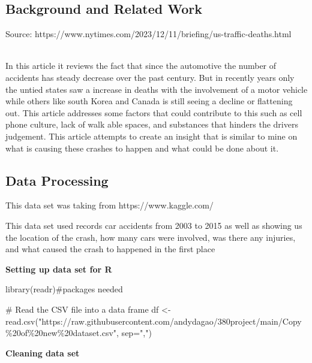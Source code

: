 \documentclass[
  letterpaper,
  DIV=11,
  numbers=noendperiod]{scrartcl}
\newenvironment{Shaded}{\begin{snugshade}}{\end{snugshade}}
\newcommand{\AttributeTok}[1]{\textcolor[rgb]{0.40,0.45,0.13}{#1}}
\newcommand{\CommentTok}[1]{\textcolor[rgb]{0.37,0.37,0.37}{#1}}
\newcommand{\FunctionTok}[1]{\textcolor[rgb]{0.28,0.35,0.67}{#1}}
\newcommand{\NormalTok}[1]{\textcolor[rgb]{0.00,0.23,0.31}{#1}}
\newcommand{\OtherTok}[1]{\textcolor[rgb]{0.00,0.23,0.31}{#1}}
\newcommand{\StringTok}[1]{\textcolor[rgb]{0.13,0.47,0.30}{#1}}
\begin{document}
\hypertarget{background-and-related-work}{%
\subsection{Background and Related
Work}\label{background-and-related-work}}

Source:
https://www.nytimes.com/2023/12/11/briefing/us-traffic-deaths.html\\
\strut \\
In this article it reviews the fact that since the automotive the number
of accidents has steady decrease over the past century. But in recently
years only the untied states saw a increase in deaths with the
involvement of a motor vehicle while others like south Korea and Canada
is still seeing a decline or flattening out. This article addresses some
factors that could contribute to this such as cell phone culture, lack
of walk able spaces, and substances that hinders the drivers judgement.
This article attempts to create an insight that is similar to mine on
what is causing these crashes to happen and what could be done about it.

\hypertarget{data-processing}{%
\subsection{Data Processing}\label{data-processing}}

This data set was taking from https://www.kaggle.com/

This data set used records car accidents from 2003 to 2015 as well as
showing us the location of the crash, how many cars were involved, was
there any injuries, and what caused the crash to happened in the first
place

\textbf{Setting up data set for R}

\begin{Shaded}
\begin{Highlighting}[]
\FunctionTok{library}\NormalTok{(readr)}\CommentTok{\#packages needed}

\CommentTok{\# Read the CSV file into a data frame}
\NormalTok{df }\OtherTok{\textless{}{-}} \FunctionTok{read.csv}\NormalTok{(}\StringTok{"https://raw.githubusercontent.com/andydagao/380project/main/Copy\%20of\%20new\%20dataset.csv"}\NormalTok{, }\AttributeTok{sep=}\StringTok{","}\NormalTok{)}
\end{Highlighting}
\end{Shaded}

\textbf{Cleaning data set}
\end{document}
